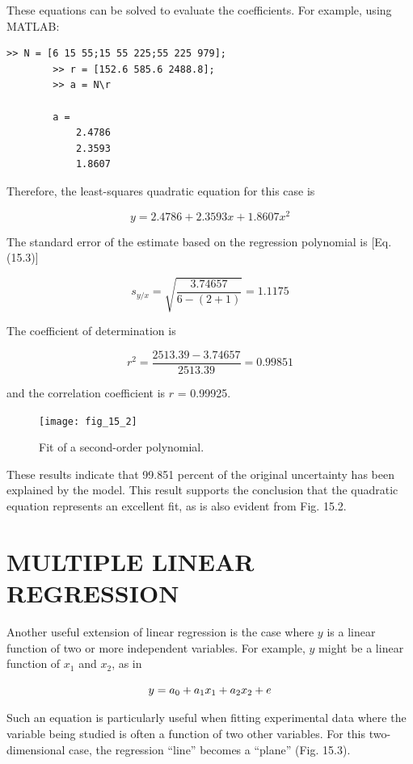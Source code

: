 \documentclass[../main.tex]{subfiles}
\begin{document}
\begin{example}
	\noindent These equations can be solved to evaluate the coefficients. For example, using MATLAB:

	\begin{lstlisting}[numbers=none]
		>> N = [6 15 55;15 55 225;55 225 979];
		>> r = [152.6 585.6 2488.8];
		>> a = N\r

		a =
			2.4786
			2.3593
			1.8607
	\end{lstlisting}

	\noindent Therefore, the least-squares quadratic equation for this case is

	$$
		y= 2.4786 + 2.3593x + 1.8607x^2
	$$

	\noindent The standard error of the estimate based on the regression polynomial is [Eq. (15.3)]

	$$
		s_{y/x} = \sqrt{\frac{3.74657}{6 - (2 + 1)}} = 1.1175
	$$

	\noindent The coefficient of determination is

	$$
		r^2 = \frac{2513.39 - 3.74657}{2513.39}= 0.99851
	$$

	\noindent and the correlation coefficient is $r$ = 0.99925.

	\begin{figure}[H]
		\centering
		\texttt{[image: fig\_15\_2]}
		\caption{\textsf{Fit of a second-order polynomial.}}
		\label{fig:fig_15_2}
	\end{figure}

	These results indicate that 99.851 percent of the original uncertainty has been explained by the model. This result supports the conclusion that the quadratic equation
represents an excellent fit, as is also evident from Fig. 15.2.
\end{example}

\label{cha:cha_P_15_2} %
\section{MULTIPLE LINEAR REGRESSION}

\noindent Another useful extension of linear regression is the case where $y$ is a linear function of two or more independent variables. For example, $y$ might be a linear function of $x_1$ and $x_2$, as in

\begin{equation}
	\notag
	y = a_0 + a_1x_1 + a_2x_2+e
\end{equation}

\noindent Such an equation is particularly useful when fitting experimental data where the variable being studied is often a function of two other variables. For this two-dimensional case, the regression ``line'' becomes a ``plane'' (Fig. 15.3).
\end{document}
